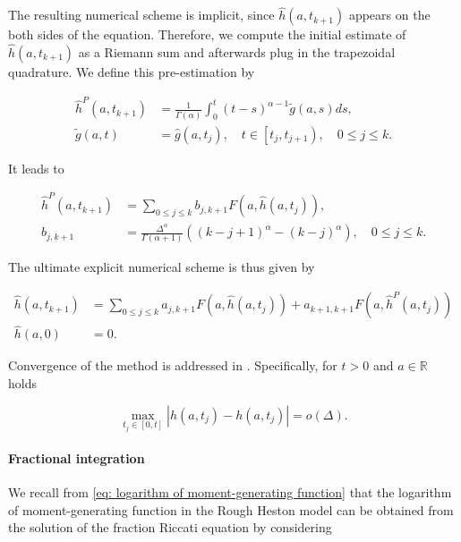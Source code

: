 \documentclass[12pt,twoside]{article}
\theoremstyle{plain}
\theoremstyle{plain}
\theoremstyle{definition}
\theoremstyle{remark}
\numberwithin{equation}{section}
\begin{document}
The resulting numerical scheme is implicit, since $\hat h (a, t_{k+1})$ appears on the both sides of the equation. Therefore, we compute the initial estimate of $\hat h (a, t_{k+1})$ as a Riemann sum and afterwards plug in the trapezoidal quadrature. We define this pre-estimation by

$$
\begin{aligned}
\hat{h}^{P}\left(a, t_{k+1}\right)&=\frac{1}{\Gamma(\alpha)} \int_{0}^{t}(t-s)^{\alpha-1} \tilde{g}(a, s) d s ,\\
\tilde{g}(a, t)&=\hat{g}\left(a, t_{j}\right), \quad t \in\left[t_{j}, t_{j+1}\right), \quad 0 \leq j \leq k.
\end{aligned}
$$

It leads to

$$
\begin{aligned}
\hat{h}^{P}\left(a, t_{k+1}\right)&=\sum_{0 \leq j \leq k} b_{j, k+1} F\left(a, \hat{h}\left(a, t_{j}\right)\right), \\
b_{j, k+1} &=\frac{\Delta^{\alpha}}{\Gamma(\alpha+1)}\left((k-j+1)^{\alpha}-(k-j)^{\alpha}\right), \quad 0 \leq j \leq k.
\end{aligned}
$$

The ultimate explicit numerical scheme is thus given by

$$
\begin{aligned}
\hat{h}\left(a, t_{k+1}\right) &= \sum_{0 \leq j \leq k} a_{j, k+1} F\left(a, \hat{h}\left(a, t_{j}\right)\right)+a_{k+1, k+1} F\left(a, \hat{h}^{P}\left(a, t_{j}\right)\right)\\[5pt]
\hat{h}(a, 0) &= 0.
\end{aligned}
$$

\vspace{10pt}

Convergence of the method is addressed in \cite{LT09}. Specifically, for $t > 0$ and $a \in \mathbb R$ holds

$$
\max _{t_{j} \in[0, t]}\left|\hat{h}\left(a, t_{j}\right)-h\left(a, t_{j}\right)\right|=o(\Delta).
$$

\paragraph{Fractional integration}

We recall from \eqref{eq: logarithm of moment-generating function} that the logarithm of moment-generating function in the Rough Heston model can be obtained from the solution of the fraction Riccati equation by considering
\end{document}
